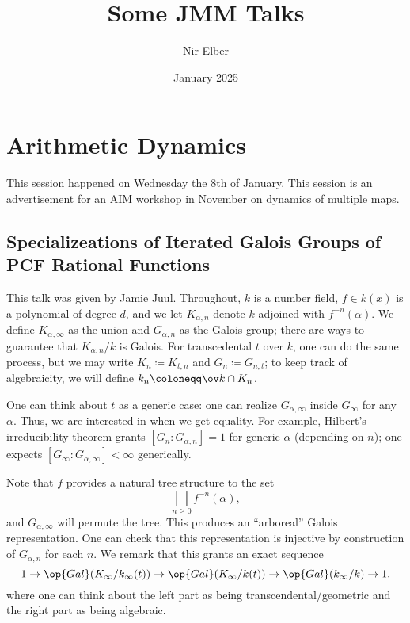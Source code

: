 \documentclass{article}
\title{Some JMM Talks}
\author{Nir Elber}
\date{January 2025}
\begin{document}
\maketitle

\tableofcontents

\section{Arithmetic Dynamics}
This session happened on Wednesday the 8th of January. This session is an advertisement for an AIM workshop in November on dynamics of multiple maps.

\subsection{Specializeations of Iterated Galois Groups of PCF Rational Functions}
This talk was given by Jamie Juul. Throughout, $k$ is a number field, $f\in k(x)$ is a polynomial of degree $d$, and we let $K_{\alpha,n}$ denote $k$ adjoined with $f^{-n}(\alpha)$. We define $K_{\alpha,\infty}$ as the union and $G_{\alpha,n}$ as the Galois group; there are ways to guarantee that $K_{\alpha,n}/k$ is Galois. For transcedental $t$ over $k$, one can do the same process, but we may write $K_n\coloneqq K_{t,n}$ and $G_n\coloneqq G_{n,t}$; to keep track of algebraicity, we will define $k_n\coloneqq\ov k\cap K_n$.

One can think about $t$ as a generic case: one can realize $G_{\alpha,\infty}$ inside $G_\infty$ for any $\alpha$. Thus, we are interested in when we get equality. For example, Hilbert's irreducibility theorem grants $[G_n:G_{\alpha,n}]=1$ for generic $\alpha$ (depending on $n$); one expects $[G_\infty:G_{\alpha,\infty}]<\infty$ generically.

Note that $f$ provides a natural tree structure to the set
\[\bigsqcup_{n\ge0}f^{-n}(\alpha),\]
and $G_{\alpha,\infty}$ will permute the tree. This produces an ``arboreal'' Galois representation. One can check that this representation is injective by construction of $G_{\alpha,n}$ for each $n$. We remark that this grants an exact sequence
\[1\to\op{Gal}(K_\infty/k_\infty(t))\to\op{Gal}(K_\infty/k(t))\to\op{Gal}(k_\infty/k)\to1,\]
where one can think about the left part as being transcendental/geometric and the right part as being algebraic.
\end{document}
